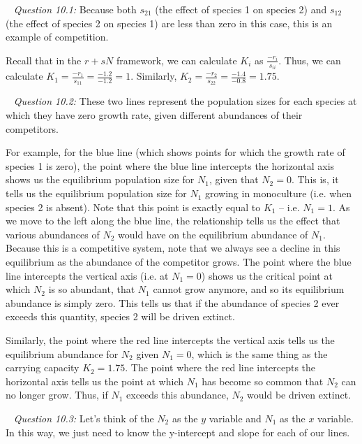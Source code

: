 \documentclass[12pt]{article}
\begin{document}
\pagebreak
{}

~\newline
\textit{Question 10.1:}
\newline
Because both $s_{21}$ (the effect of species 1 on species 2) and $s_{12}$ (the effect of species 2 on species 1) are less than zero in this case, this is an example of competition.

Recall that in the $r + sN$ framework, we can calculate $K_i$ as $\frac{-r_i}{s_{ii}}$. Thus, we can calculate $K_1 = \frac{-r_1}{s_{11}} = \frac{-1.2}{-1.2} = 1$. Similarly, $K_2 = \frac{-r_2}{s_{22}} = \frac{-1.4}{-0.8} = 1.75$. 

~\newline
\textit{Question 10.2:}
\newline
These two lines represent the population sizes for each species at which they have zero growth rate, given different abundances of their competitors.

For example, for the blue line (which shows points for which the growth rate of species 1 is zero), the point where the blue line intercepts the horizontal axis shows us the equilibrium population size for $N_1$, given that $N_2 = 0$. This is, it tells us the equilibrium population size for $N_1$ growing in monoculture (i.e. when species 2 is absent). Note that this point is exactly equal to $K_1$ -- i.e. $N_1 = 1$. As we move to the left along the blue line, the relationship tells us the effect that various abundances of $N_2$ would have on the equilibrium abundance of $N_1$. Because this is a competitive system, note that we always see a decline in this equilibrium as the abundance of the competitor grows. The point where the blue line intercepts the vertical axis (i.e. at $N_1 = 0$) shows us the critical point at which $N_2$ is so abundant, that $N_1$ cannot grow anymore, and so its equilibrium abundance is simply zero. This tells us that if the abundance of species 2 ever exceeds this quantity, species 2 will be driven extinct.


Similarly, the point where the red line intercepts the vertical axis tells us the equilibrium abundance for $N_2$ given $N_1 = 0$, which is the same thing as the carrying capacity $K_2 = 1.75$. The point where the red line intercepts the horizontal axis tells us the point at which $N_1$ has become so common that $N_2$ can no longer grow. Thus, if $N_1$ exceeds this abundance, $N_2$ would be driven extinct.

~\newline
\textit{Question 10.3:}
\newline
Let's think of the $N_2$ as the $y$ variable and $N_1$ as the $x$ variable. In this way, we just need to know the y-intercept and slope for each of our lines.
\end{document}
